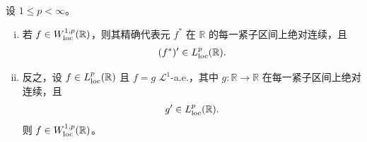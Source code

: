 ﻿\documentclass[../../main.tex]{subfiles}%
\begin{document}
\begin{theorem}[一元 Sobolev 函数]\label{theorem:ch04-4-20}
设 $1\leqslant p<\infty$。
\begin{enumerate}[(i)]
\item 若 $f\in W^{1,p}_{\mathrm{loc}}(\mathbb{R})$，则其精确代表元 $f^{*}$ 在 $\mathbb{R}$ 的每一紧子区间上绝对连续，且
\begin{align*}
(f^{*})'\in L^{p}_{\mathrm{loc}}(\mathbb{R}).
\end{align*}
\item 反之，设 $f\in L^{p}_{\mathrm{loc}}(\mathbb{R})$ 且 $f=g$ $\mathcal{L}^{1}$-a.e.，其中 $g:\mathbb{R}\to\mathbb{R}$ 在每一紧子区间上绝对连续，且
\begin{align*}
g'\in L^{p}_{\mathrm{loc}}(\mathbb{R}).
\end{align*}
则 $f\in W^{1,p}_{\mathrm{loc}}(\mathbb{R})$。
\end{enumerate}
\end{theorem}
\end{document}
